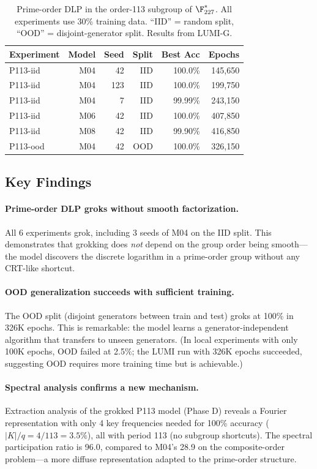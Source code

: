 \documentclass[11pt]{article}
\begin{document}
\begin{table}[t]
\centering
\caption{Prime-order DLP in the order-113 subgroup of $\F_{227}^*$. All experiments use 30\% training data. ``IID'' = random split, ``OOD'' = disjoint-generator split. Results from LUMI-G.}
\label{tab:prime_order_results}
\begin{tabular}{lrrrrr}
\toprule
Experiment & Model & Seed & Split & Best Acc & Epochs \\
\midrule
P113-iid & M04 & 42 & IID & 100.0\% & 145,650 \\
P113-iid & M04 & 123 & IID & 100.0\% & 199,750 \\
P113-iid & M04 & 7 & IID & 99.99\% & 243,150 \\
P113-iid & M06 & 42 & IID & 100.0\% & 407,850 \\
P113-iid & M08 & 42 & IID & 99.90\% & 416,850 \\
P113-ood & M04 & 42 & OOD & 100.0\% & 326,150 \\
\bottomrule
\end{tabular}
\end{table}

\subsection{Key Findings}

\paragraph{Prime-order DLP groks without smooth factorization.}
All 6 experiments grok, including 3 seeds of M04 on the IID split. This demonstrates that grokking does \emph{not} depend on the group order being smooth---the model discovers the discrete logarithm in a prime-order group without any CRT-like shortcut.

\paragraph{OOD generalization succeeds with sufficient training.}
The OOD split (disjoint generators between train and test) groks at 100\% in 326K epochs. This is remarkable: the model learns a generator-independent algorithm that transfers to unseen generators. (In local experiments with only 100K epochs, OOD failed at 2.5\%; the LUMI run with 326K epochs succeeded, suggesting OOD requires more training time but is achievable.)

\paragraph{Spectral analysis confirms a new mechanism.}
Extraction analysis of the grokked P113 model (Phase D) reveals a Fourier representation with only 4 key frequencies needed for 100\% accuracy ($|K|/q = 4/113 = 3.5\%$), all with period 113 (no subgroup shortcuts). The spectral participation ratio is 96.0, compared to M04's 28.9 on the composite-order problem---a more diffuse representation adapted to the prime-order structure.
\end{document}
